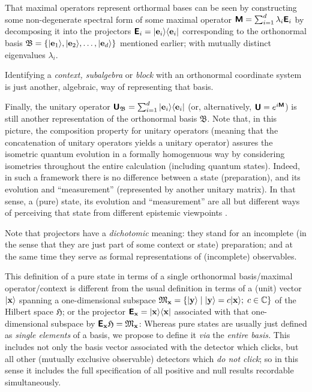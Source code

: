 \documentclass[%
 preprint,
 showpacs,
 showkeys,
 preprintnumbers,
 amsmath,amssymb,
 aps,
  pra,
  longbibliography,
 ]{revtex4-1}
\begin{document}
That maximal operators represent orthormal bases can be seen by constructing some non-degenerate spectral form
of some maximal operator
$\textsf{\textbf{M}} =\sum_{i=1}^d \lambda_i\textsf{\textbf{E}}_{i}$
by decomposing it into the projectors
$\textsf{\textbf{E}}_{i}= \vert {\bf e}_i \rangle \langle {\bf e}_i \vert$
corresponding to the orthonormal basis
${\mathfrak B} =\{ \vert {\bf e}_1 \rangle, \vert {\bf e}_2 \rangle, \ldots , \vert {\bf e}_d \rangle \}$
mentioned earlier; with mutually distinct eigenvalues $\lambda_i$.


Identifying a {\em context, subalgebra} or {\em block} with an orthonormal coordinate system is just another, algebraic, way of representing that basis.

Finally, the unitary operator
$\textsf{\textbf{U}}_{{\mathfrak B}}=   \sum_{i=1}^d  \vert {\bf e}_i\rangle \langle {\bf e}_i \vert $
(or, alternatively,   $\textsf{\textbf{U}} = e^{i \textsf{\textbf{M}}}$)
is still another representation of the orthonormal basis ${\mathfrak B}$.
Note that, in this picture, the composition property
for unitary operators (meaning that the concatenation of unitary operators yields a unitary operator)
assures the isometric quantum evolution  in a formally homogenuous way by considering isometries throughout the entire calculation (including quantum states).
Indeed, in such a framework there is no difference between a state (preparation), and its evolution and ``measurement'' (represented by another
unitary matrix).
In that sense, a (pure) state, its evolution and ``measurement'' are all but different ways of perceiving that state from different epistemic
viewpoints \cite{DallaChiara-epistemic}.

Note that projectors have a {\it dichotomic} meaning: they stand for an incomplete (in the sense that they are just part of
some context or state) preparation; and at the same time they serve as formal representations of (incomplete) observables.

This definition of a pure state in terms of a single orthonormal basis/maximal operator/context
is different from the usual definition in terms of a (unit) vector $\vert {\bf x}\rangle$
spanning a one-dimensional subspace ${\mathfrak M}_{\bf x}= \{ \vert {\bf y}\rangle \mid  \vert {\bf y}\rangle= c  \vert {\bf x}\rangle; \; c\in {\mathbb C} \}$
of the Hilbert space ${\mathfrak H}$; or the projector $\textsf{\textbf{E}}_{\bf x}= \vert {\bf x} \rangle \langle {\bf x}\vert$ associated with that
one-dimensional subspace by $\textsf{\textbf{E}}_{\bf x}{\mathfrak H}={\mathfrak M}_{\bf x}$:
Whereas pure states are usually just defined as {\em single elements} of a basis,
we propose to define it {\em via} the {\em entire basis.}
This includes not only the basis vector associated with the detector which clicks,
but all other (mutually exclusive observable) detectors which {\em do not click};
so in this sense it includes the full specification of all positive and null results recordable simultaneously.
\end{document}
